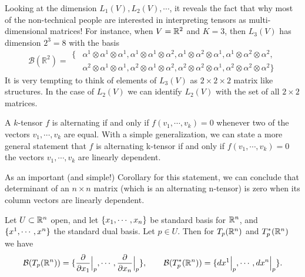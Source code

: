 \begin{summary}
		Looking at the dimension $ L_1(V), L_2(V), \cdots $, it reveals the fact that why most of the non-technical people are interested in interpreting tensors as multi-dimensional matrices! For instance, when $ V = \mathbb{R}^2 $ and $ K=3 $, then $ L_3(V) $ has dimension $ 2^3 = 8 $ with the basis
	\[
	\mathcal{B} (\mathbb{R}^2) = 
	\begin{aligned}
		\{&\alpha^1 \otimes \alpha^1 \otimes \alpha^1, \alpha^1 \otimes \alpha^1 \otimes \alpha^2, \alpha^1 \otimes \alpha^2 \otimes \alpha^1, \alpha^1 \otimes \alpha^2 \otimes \alpha^2, \\
		&\alpha^2 \otimes \alpha^1 \otimes \alpha^1, \alpha^2 \otimes \alpha^1 \otimes \alpha^2, \alpha^2 \otimes \alpha^2 \otimes \alpha^1, \alpha^2 \otimes \alpha^2 \otimes \alpha^2 \}
	\end{aligned}
	\]
	It is very tempting to think of elements of $ L_3(V) $ as $ 2\times 2\times 2 $ matrix like structures. In the case of $ L_2(V) $ we can identify $ L_2(V) $ with the set of all $ 2\times 2 $ matrices.
\end{summary}

\begin{summary}
	A $ k$-tensor $ f $ is alternating if and only if $ f(v_1,\cdots,v_k) = 0 $ whenever two of the vectors $ v_1,\cdots,v_k $ are equal. With a simple generalization, we can state a more general statement that $ f $ is alternating k-tensor if and only if $ f(v_1,\cdots,v_k) = 0 $ the vectors $ v_1,\cdots,v_k $ are linearly dependent.
	
	As an important (and simple!) Corollary for this statement, we can conclude that determinant of an $ n\times n $ matrix (which is an alternating n-tensor) is zero when its column vectors are linearly dependent.
\end{summary}

\begin{summary}
	Let $ U \subset \mathbb{R}^n $ open, and let $ \{x_1,\cdots,x_n\} $ be standard basis for $ \mathbb{R}^n $, and $ \{x^1,\cdots,x^n\} $ the standard dual basis. Let $ p \in U $. Then for $ T_p(\mathbb{R}^n) $ and $ T^*_p(\mathbb{R}^n) $ we have
	\[ \mathcal{B}(T_p(\mathbb{R}^n)) = \{\frac{\partial}{\partial x_1}\big|_{p},\cdots,\frac{\partial}{\partial x_n}\big|_{p}\}, 
	\qquad
	\mathcal{B}(T_p^*(\mathbb{R}^n)) = \{ dx^1\big|_{p},\cdots,dx^n\big|_{p} \}.
	 \]
\end{summary}

